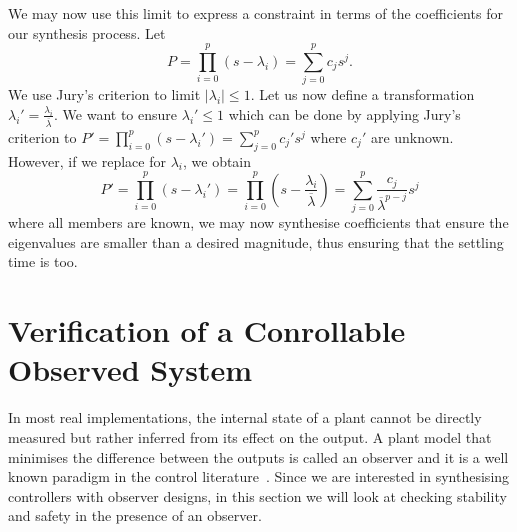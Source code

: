 \documentclass[sigconf]{llncs}
\begin{document}
%
We may now use this limit to express a constraint in terms of the
coefficients for our synthesis process.  Let
%
\begin{equation}
P=\prod_{i=0}^p (s-\lambda_i)=\sum_{j=0}^p c_js^j.
\end{equation}
%
We use Jury's criterion to limit $|\lambda_i| \leq 1$.  Let us now define a
transformation $\lambda_i'=\frac{\lambda_i}{\overline{\lambda}}$.  We want
to ensure $\lambda_i' \leq 1$ which can be done by applying Jury's criterion
to $P'=\prod_{i=0}^p (s-\lambda_i')=\sum_{j=0}^p c_j's^j$ where $c_j'$ are
unknown.  However, if we replace for $\lambda_i$, we obtain
%
\begin{equation}
P'=\prod_{i=0}^p (s-\lambda_i')=\prod_{i=0}^p \left(s-\frac{\lambda_i}{\overline{\lambda}}\right)=\sum_{j=0}^p \frac{c_j}{\overline{\lambda}^{p-j}}s^j
\end{equation}
%
where all members are known, we may now synthesise coefficients that ensure
the eigenvalues are smaller than a desired magnitude, thus ensuring that the
settling time is too.

\section{Verification of a Conrollable Observed System}\label{sec:cof_verification}

In most real implementations, the internal state of a plant cannot be
directly measured but rather inferred from its
effect on the output. A plant model that minimises the difference
between the outputs is called an observer and it is a well known
paradigm in the control literature~\cite{astrom1997computer}. Since we
are interested in synthesising controllers with observer designs, in this
section we will look at checking stability and safety in the presence of an observer.

\end{document}
